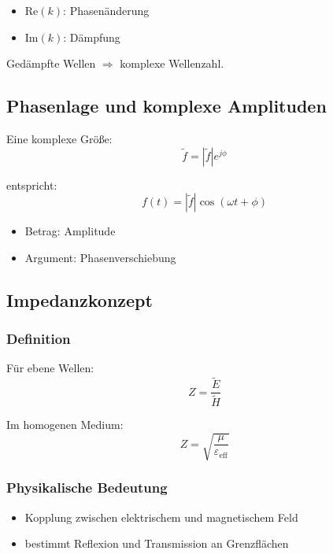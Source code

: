 \documentclass[a4paper]{article}
\newcommand{\eps}{\varepsilon}
\begin{document}
\begin{itemize}
  \item Re$(k)$: Phasenänderung
  \item Im$(k)$: Dämpfung
\end{itemize}

\begin{schema}
Gedämpfte Wellen $\Rightarrow$ komplexe Wellenzahl.
\end{schema}

\subsection{Phasenlage und komplexe Amplituden}

Eine komplexe Größe:
\[
\tilde f = |\tilde f| e^{j\phi}
\]

entspricht:
\[
f(t)=|\tilde f|\cos(\omega t + \phi)
\]

\begin{merke}
\begin{itemize}
  \item Betrag: Amplitude
  \item Argument: Phasenverschiebung
\end{itemize}
\end{merke}

\subsection{Impedanzkonzept}

\subsubsection{Definition}

Für ebene Wellen:
\[
Z=\frac{\tilde E}{\tilde H}
\]

Im homogenen Medium:
\[
Z=\sqrt{\frac{\mu}{\eps_\text{eff}}}
\]

\subsubsection{Physikalische Bedeutung}

\begin{itemize}
  \item Kopplung zwischen elektrischem und magnetischem Feld
  \item bestimmt Reflexion und Transmission an Grenzflächen
\end{itemize}
\end{document}
